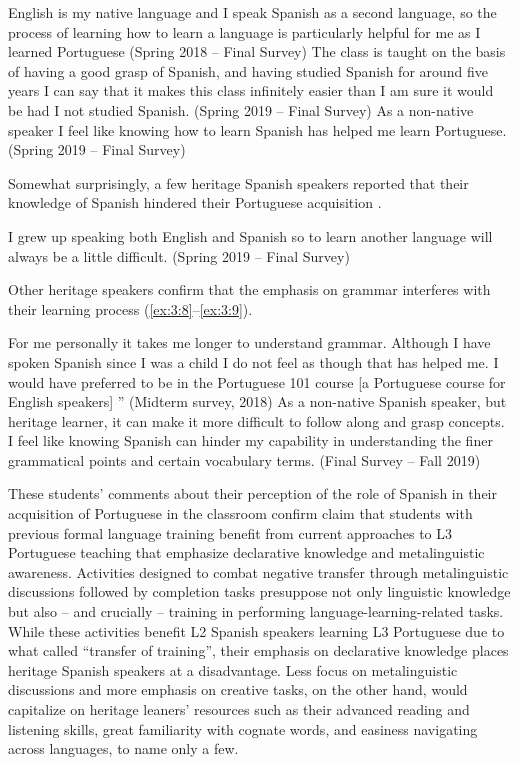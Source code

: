 \documentclass[output=paper]{../langscibook}
\begin{document}
\ea%
    \label{ex:3:4}
    English is my native language and I speak Spanish as a second language, so the process of learning how to learn a language is particularly helpful for me as I learned Portuguese (Spring 2018 – Final Survey)
\ex%
    \label{ex:3:5}
    The class is taught on the basis of having a good grasp of Spanish, and having studied Spanish for around five years I can say that it makes this class infinitely easier than I am sure it would be had I not studied Spanish. (Spring 2019 – Final Survey)
\ex%
    \label{ex:3:6}
    As a non-native speaker I feel like knowing how to learn Spanish has helped me learn Portuguese. (Spring 2019 – Final Survey)            
\z

Somewhat surprisingly, a few heritage Spanish speakers reported that their knowledge of Spanish hindered their Portuguese acquisition .

\ea%
\label{ex:3:7}
I grew up speaking both English and Spanish so to learn another language will always be a little difficult. (Spring 2019 – Final Survey)
\z

Other heritage speakers confirm that the emphasis on grammar interferes with their learning process (\ref{ex:3:8}--\ref{ex:3:9}).

\ea%
\label{ex:3:8}
For me personally it takes me longer to understand grammar. Although I have spoken Spanish since I was a child I do not feel as though that has helped me. I would have preferred to be in the Portuguese 101 course [a Portuguese course for English speakers] ” (Midterm survey, 2018)
\ex%
\label{ex:3:9}
As a non-native Spanish speaker, but heritage learner, it can make it more difficult to follow along and grasp concepts. I feel like knowing Spanish can hinder my capability in understanding the finer grammatical points and certain vocabulary terms. (Final Survey – Fall 2019)
\z

These students’ comments about their perception of the role of Spanish in their acquisition of Portuguese in the classroom confirm  claim that students with previous formal language training benefit from current approaches to L3 Portuguese teaching that emphasize declarative knowledge and metalinguistic awareness. Activities designed to combat negative transfer through metalinguistic discussions followed by completion tasks presuppose not only linguistic knowledge but also -- and crucially -- training in performing language-learning-related tasks. While these activities benefit L2 Spanish speakers learning L3 Portuguese due to what \citet[34]{Odlin1989} called “transfer of training”, their emphasis on declarative knowledge places heritage Spanish speakers at a disadvantage. Less focus on metalinguistic discussions and more emphasis on creative tasks, on the other hand, would capitalize on heritage leaners’ resources such as their advanced reading and listening skills, great familiarity with cognate words, and easiness navigating across languages, to name only a few. 
\end{document}
